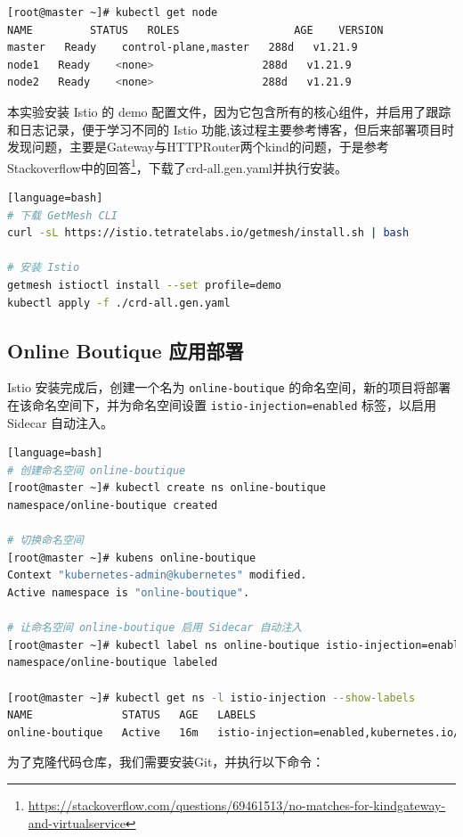 \begin{lstlisting}[language=bash]
[root@master ~]# kubectl get node
NAME         STATUS   ROLES                  AGE    VERSION
master   Ready    control-plane,master   288d   v1.21.9
node1   Ready    <none>                 288d   v1.21.9
node2   Ready    <none>                 288d   v1.21.9
\end{lstlisting}

本实验安装 Istio 的 demo 配置文件，因为它包含所有的核心组件，并启用了跟踪和日志记录，便于学习不同的 Istio 功能,该过程主要参考博客\cite{istio}，但后来部署项目时发现问题，主要是Gateway与HTTPRouter两个kind的问题，于是参考Stackoverflow中的回答\footnote{\url{https://stackoverflow.com/questions/69461513/no-matches-for-kindgateway-and-virtualservice}}，下载了crd-all.gen.yaml并执行安装。

\begin{lstlisting}[language=bash][language=bash]
# 下载 GetMesh CLI
curl -sL https://istio.tetratelabs.io/getmesh/install.sh | bash

# 安装 Istio
getmesh istioctl install --set profile=demo
kubectl apply -f ./crd-all.gen.yaml
\end{lstlisting}
\subsection{Online Boutique 应用部署}
Istio 安装完成后，创建一个名为 \texttt{online-boutique} 的命名空间，新的项目将部署在该命名空间下，并为命名空间设置 \texttt{istio-injection=enabled} 标签，以启用 Sidecar 自动注入。

\begin{lstlisting}[language=bash][language=bash]
# 创建命名空间 online-boutique
[root@master ~]# kubectl create ns online-boutique
namespace/online-boutique created

# 切换命名空间
[root@master ~]# kubens online-boutique
Context "kubernetes-admin@kubernetes" modified.
Active namespace is "online-boutique".

# 让命名空间 online-boutique 启用 Sidecar 自动注入
[root@master ~]# kubectl label ns online-boutique istio-injection=enabled
namespace/online-boutique labeled

[root@master ~]# kubectl get ns -l istio-injection --show-labels
NAME              STATUS   AGE   LABELS
online-boutique   Active   16m   istio-injection=enabled,kubernetes.io/metadata.name=online-boutique
\end{lstlisting}

为了克隆代码仓库，我们需要安装Git，并执行以下命令：

